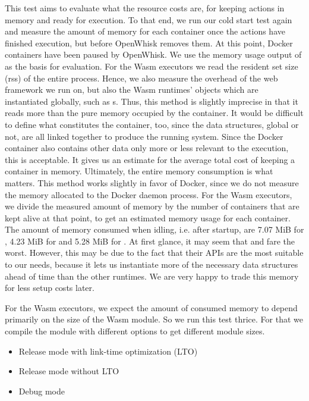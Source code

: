 This test aims to evaluate what the resource costs are, for keeping actions in memory and ready for execution.
To that end, we run our cold start test again and measure the amount of memory for each container once the actions have finished execution, but before OpenWhisk removes them. At this point, Docker containers have been paused by OpenWhisk. We use the memory usage output of  as the basis for evaluation. For the Wasm executors we read the resident set size (rss) of the entire process. Hence, we also measure the overhead of the web framework we run on, but also the Wasm runtimes' objects which are instantiated globally, such as s. Thus, this method is slightly imprecise in that it reads more than the pure memory occupied by the container. It would be difficult to define what constitutes the container, too, since the data structures, global or not, are all linked together to produce the running system. Since the Docker container also contains other data only more or less relevant to the execution, this is acceptable. It gives us an estimate for the average total cost of keeping a container in memory. Ultimately, the entire memory consumption is what matters. This method works slightly in favor of Docker, since we do not measure the memory allocated to the Docker daemon process.
For the Wasm executors, we divide the measured amount of memory by the number of containers that are kept alive at that point, to get an estimated memory usage for each container. The amount of memory consumed when idling, i.e. after startup, are 7.07 MiB for , 4.23 MiB for  and 5.28 MiB for . At first glance, it may seem that  and  fare the worst. However, this may be due to the fact that their APIs are the most suitable to our needs, because it lets us instantiate more of the necessary data structures ahead of time than the other runtimes. We are very happy to trade this memory for less setup costs later.

For the Wasm executors, we expect the amount of consumed memory to depend primarily on the size of the Wasm module.
So we run this test thrice. For that we compile the  module with different options to get different module sizes.

\begin{itemize}
    \item Release mode with link-time optimization (LTO)
    \item Release mode without LTO
    \item Debug mode
\end{itemize}

